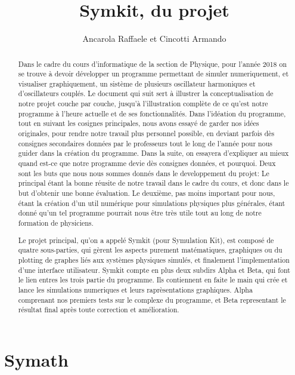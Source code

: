 \documentclass{report}
\title{Symkit, du projet}
\author{Ancarola Raffaele et Cincotti Armando}
\begin{document}
\maketitle

\tableofcontents

\begin{abstract}

Dans le cadre du cours d'informatique de la section de Physique, pour l'année 2018 on se trouve à devoir développer
un programme permettant de simuler numeriquement, et visualiser graphiquement, un sistème de plusieurs oscillateur harmoniques
et d'oscillateurs couplés.
Le document qui suit sert à illustrer la conceptualisation de notre projet couche par couche, jusqu'à l'illustration complète
de ce qu'est notre programme à l'heure actuelle et de ses fonctionnalités.
Dans l'idéation du programme, tout en suivant les cosignes principales, nous avons essayé de garder nos idées originales,
pour rendre notre travail plus personnel possible, en deviant parfois dès consignes secondaires données par le professeurs
tout le long de l'année pour nous guider dans la création du programme.
Dans la suite, on essayera d'expliquer au mieux quand est-ce que notre programme devie dès consignes données, et pourquoi.
Deux sont les buts que nous nous sommes donnés dans le developpement du projet:
Le principal étant la bonne réusite de notre travail dans le cadre du cours, et donc dans le but d'obtenir une bonne évaluation.
Le deuxième, pas moins important pour nous, étant la création d'un util numérique pour simulations physiques plus générales,
étant donné qu'un tel programme pourrait nous être très utile tout au long de notre formation de physiciens.

Le projet principal, qu'on a appelé Symkit (pour Symulation Kit), est composé de quatre sous-parties, qui gèrent les aspects purement 
matématiques, graphiques ou du plotting de graphes liés aux systèmes physiques simulés, et finalement l'implementation d'une interface utilisateur.
Symkit compte en plus deux subdirs Alpha et Beta, qui font le lien entres les trois partie du programme. 
Ils contiennent en faite le main qui crée et lance les simulations numeriques et leurs raprèsentations graphiques.
Alpha comprenant nos premiers tests sur le complexe du programme, et Beta representant le résultat final après toute correction et 
amélioration.

\end{abstract}

\chapter{Symath}
\end{document}
